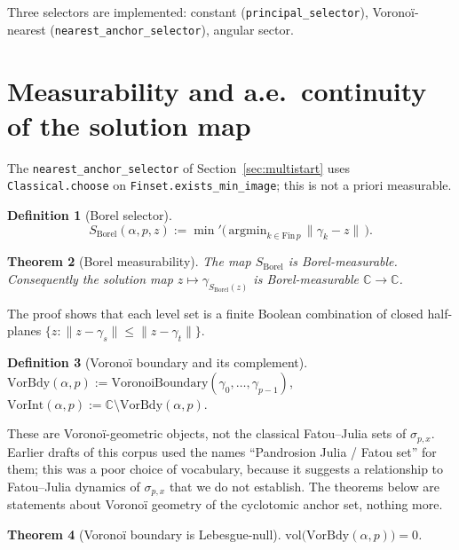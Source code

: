 \documentclass[11pt,a4paper]{article}
\newtheorem{theorem}{Theorem}[section]
\theoremstyle{definition}
\newtheorem{definition}[theorem]{Definition}
\theoremstyle{remark}
\begin{document}
Three selectors are implemented: constant (\texttt{principal\_selector}),
Voronoï-nearest (\texttt{nearest\_anchor\_selector}), angular sector.

\section{Measurability and a.e.\ continuity of the solution map}
\label{sec:analysis}

The \texttt{nearest\_anchor\_selector} of Section~\ref{sec:multistart}
uses \texttt{Classical.choose} on \texttt{Finset.exists\_min\_image};
this is not a priori measurable.

\begin{definition}[Borel selector]
\[
  S_{\mathrm{Borel}}(\alpha, p, z) := \min{}'
  \big(\,\mathrm{argmin}_{k \in \mathrm{Fin}\,p}\,\|\gamma_k - z\|\,\big).
\]
\end{definition}

\begin{theorem}[Borel measurability]\label{thm:borel}
The map $S_{\mathrm{Borel}}$ is Borel-measurable. Consequently the
solution map $z \mapsto \gamma_{S_{\mathrm{Borel}}(z)}$ is Borel-measurable
$\mathbb{C} \to \mathbb{C}$.
\end{theorem}

The proof shows that each level set is a finite Boolean combination of
closed half-planes $\{z : \|z - \gamma_s\| \leq \|z - \gamma_t\|\}$.

\begin{definition}[Voronoï boundary and its complement]
$\mathrm{VorBdy}(\alpha, p) := \mathrm{VoronoiBoundary}(\gamma_0, \dots, \gamma_{p-1})$,
$\mathrm{VorInt}(\alpha, p) := \mathbb{C} \setminus \mathrm{VorBdy}(\alpha, p)$.
\end{definition}

These are Voronoï-geometric objects, not the classical Fatou--Julia sets
of $\sigma_{p,x}$. Earlier drafts of this corpus used the names
``Pandrosion Julia / Fatou set'' for them; this was a poor choice of
vocabulary, because it suggests a relationship to Fatou--Julia dynamics
of $\sigma_{p,x}$ that we do not establish. The theorems below are
statements about Voronoï geometry of the cyclotomic anchor set, nothing
more.

\begin{theorem}[Voronoï boundary is Lebesgue-null]\label{thm:julia-null}
$\mathrm{vol}\big(\mathrm{VorBdy}(\alpha, p)\big) = 0$.
\end{theorem}
\end{document}
